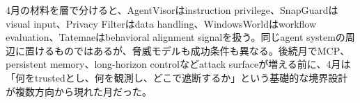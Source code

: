 4月の材料を層で分けると、AgentVisorはinstruction privilege、SnapGuardはvisual input、Privacy Filterはdata handling、WindowsWorldはworkflow evaluation、Tatemaeはbehavioral alignment signalを扱う。同じagent systemの周辺に置けるものではあるが、脅威モデルも成功条件も異なる。後続月でMCP、persistent memory、long-horizon controlなどattack surfaceが増える前に、4月は「何をtrustedとし、何を観測し、どこで遮断するか」という基礎的な境界設計が複数方向から現れた月だった。\autocite{src-3efc4342b784,src-477d406be59c,src-73ae4b975e7b,src-8cf1b0dc8361,src-a408165af133}


